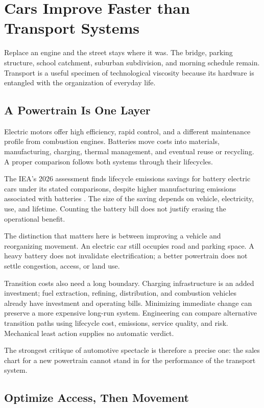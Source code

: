 \section{Cars Improve Faster than Transport Systems}

Replace an engine and the street stays where it was. The bridge, parking structure, school catchment, suburban subdivision, and morning schedule remain. Transport is a useful specimen of technological viscosity because its hardware is entangled with the organization of everyday life.

\subsection{A Powertrain Is One Layer}

Electric motors offer high efficiency, rapid control, and a different maintenance profile from combustion engines. Batteries move costs into materials, manufacturing, charging, thermal management, and eventual reuse or recycling. A proper comparison follows both systems through their lifecycles.

The IEA's 2026 assessment finds lifecycle emissions savings for battery electric cars under its stated comparisons, despite higher manufacturing emissions associated with batteries \cite{iea2026evlifecycle}. The size of the saving depends on vehicle, electricity, use, and lifetime. Counting the battery bill does not justify erasing the operational benefit.

The distinction that matters here is between improving a vehicle and reorganizing movement. An electric car still occupies road and parking space. A heavy battery does not invalidate electrification; a better powertrain does not settle congestion, access, or land use.

Transition costs also need a long boundary. Charging infrastructure is an added investment; fuel extraction, refining, distribution, and combustion vehicles already have investment and operating bills. Minimizing immediate change can preserve a more expensive long-run system. Engineering can compare alternative transition paths using lifecycle cost, emissions, service quality, and risk. Mechanical least action supplies no automatic verdict.

The strongest critique of automotive spectacle is therefore a precise one: the sales chart for a new powertrain cannot stand in for the performance of the transport system.

\subsection{Optimize Access, Then Movement}

